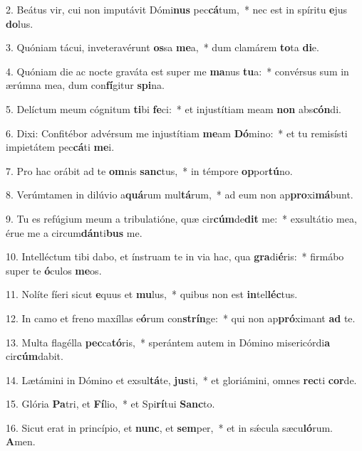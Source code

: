2. Beátus vir, cui non imputávit Dómi\textbf{nus} pec\textbf{cá}tum,~*  nec est in spíritu \textbf{e}jus \textbf{do}lus.\

3. Quóniam tácui, inveteravérunt \textbf{os}sa \textbf{me}a,~*  dum clamárem \textbf{to}ta \textbf{di}e.\

4. Quóniam die ac nocte graváta est super me \textbf{ma}nus \textbf{tu}a:~*  convérsus sum in ærúmna mea, dum con\textbf{fí}gitur \textbf{spi}na.\

5. Delíctum meum cógnitum \textbf{ti}bi \textbf{fe}ci:~*  et injustítiam meam \textbf{non} abs\textbf{cón}di.\

6. Dixi: Confitébor advérsum me injustítiam \textbf{me}am \textbf{Dó}mino:~*  et tu remisísti impietátem pec\textbf{cá}ti \textbf{me}i.\

7. Pro hac orábit ad te \textbf{om}nis \textbf{sanc}tus,~*  in témpore \textbf{op}por\textbf{tú}no.\

8. Verúmtamen in dilúvio a\textbf{quá}rum mul\textbf{tá}rum,~*  ad eum non ap\textbf{pro}xi\textbf{má}bunt.\

9. Tu es refúgium meum a tribulatióne, quæ cir\textbf{cúm}de\textbf{dit} me:~*  exsultátio mea, érue me a circum\textbf{dán}ti\textbf{bus} me.\

10. Intelléctum tibi dabo, et ínstruam te in via hac, qua \textbf{gra}di\textbf{é}ris:~*  firmábo super te \textbf{ó}culos \textbf{me}os.\

11. Nolíte fíeri sicut \textbf{e}quus et \textbf{mu}lus,~*  quibus non est \textbf{in}tel\textbf{léc}tus.\

12. In camo et freno maxíllas e\textbf{ó}rum con\textbf{strín}ge:~*  qui non ap\textbf{pró}ximant \textbf{ad} te.\

13. Multa flagélla \textbf{pec}ca\textbf{tó}ris,~*  sperántem autem in Dómino misericórdi\textbf{a} cir\textbf{cúm}dabit.\

14. Lætámini in Dómino et exsul\textbf{tá}te, \textbf{jus}ti,~*  et gloriámini, omnes \textbf{rec}ti \textbf{cor}de.\

15. Glória \textbf{Pa}tri, et \textbf{Fí}lio,~*  et Spi\textbf{rí}tui \textbf{Sanc}to.\

16. Sicut erat in princípio, et \textbf{nunc}, et \textbf{sem}per,~*  et in sǽcula sæcu\textbf{ló}rum. \textbf{A}men.\

